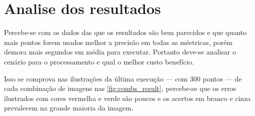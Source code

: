 \section{Analise dos resultados}

Percebe-se com os dados das  que os resultados são bem parecidos e que quanto mais pontos forem usados melhor a precisão em todas as méetricas, porém demora mais segundos em média para executar. Portanto deve-se analisar o cenário para o processamento e qual o melhor custo benefício.

Isso se comprova nas ilustrações da última execução — com 300 pontos — de cada combinação de imagens nas \cref{fig:combs_result}, percebe-se que os erros ilustrados com cores vermelha e verde são poucos e os acertos em branco e cinza prevalecem na grande maioria da imagem.



